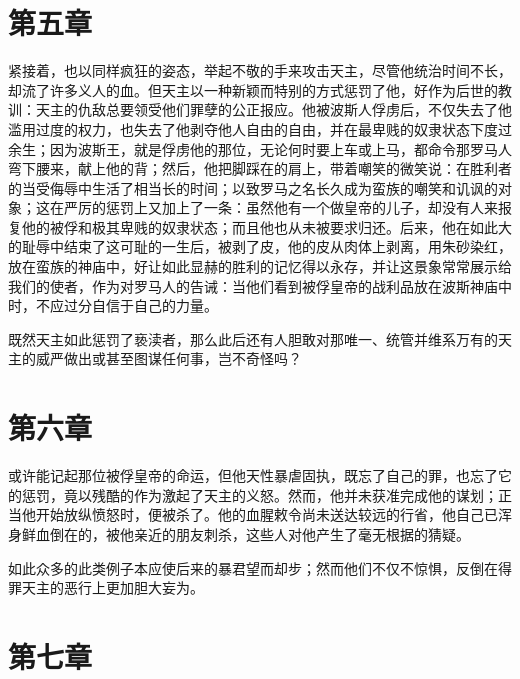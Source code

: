 \section{第五章}

紧接着，也以同样疯狂的姿态，举起不敬的手来攻击天主，尽管他统治时间不长，却流了许多义人的血。但天主以一种新颖而特别的方式惩罚了他，好作为后世的教训：天主的仇敌总要领受他们罪孽的公正报应。他被波斯人俘虏后，不仅失去了他滥用过度的权力，也失去了他剥夺他人自由的自由，并在最卑贱的奴隶状态下度过余生；因为波斯王，就是俘虏他的那位，无论何时要上车或上马，都命令那罗马人弯下腰来，献上他的背；然后，他把脚踩在的肩上，带着嘲笑的微笑说：在胜利者的当受侮辱中生活了相当长的时间；以致罗马之名长久成为蛮族的嘲笑和讥讽的对象；这在严厉的惩罚上又加上了一条：虽然他有一个做皇帝的儿子，却没有人来报复他的被俘和极其卑贱的奴隶状态；而且他也从未被要求归还。后来，他在如此大的耻辱中结束了这可耻的一生后，被剥了皮，他的皮从肉体上剥离，用朱砂染红，放在蛮族的神庙中，好让如此显赫的胜利的记忆得以永存，并让这景象常常展示给我们的使者，作为对罗马人的告诫：当他们看到被俘皇帝的战利品放在波斯神庙中时，不应过分自信于自己的力量。\par

既然天主如此惩罚了亵渎者，那么此后还有人胆敢对那唯一、统管并维系万有的天主的威严做出或甚至图谋任何事，岂不奇怪吗？\par


\section{第六章}

或许能记起那位被俘皇帝的命运，但他天性暴虐固执，既忘了自己的罪，也忘了它的惩罚，竟以残酷的作为激起了天主的义怒。然而，他并未获准完成他的谋划；正当他开始放纵愤怒时，便被杀了。他的血腥敕令尚未送达较远的行省，他自己已浑身鲜血倒在的，被他亲近的朋友刺杀，这些人对他产生了毫无根据的猜疑。\par

如此众多的此类例子本应使后来的暴君望而却步；然而他们不仅不惊惧，反倒在得罪天主的恶行上更加胆大妄为。\par


\section{第七章}

